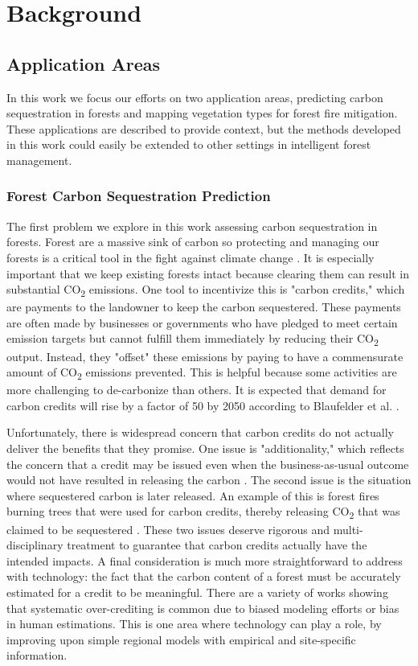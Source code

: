\chapter{Background} \label{chapBackground}
\section{Application Areas}
In this work we focus our efforts on two application areas, predicting carbon sequestration in forests and mapping vegetation types for forest fire mitigation. These applications are described to provide context, but the methods developed in this work could easily be extended to other settings in intelligent forest management.
\subsection{Forest Carbon Sequestration Prediction}
The first problem we explore in this work assessing carbon sequestration in forests. Forest are a massive sink of carbon so protecting and managing our forests is a critical tool in the fight against climate change \cite{Griscom2017NaturalSolutions}. 
It is especially important that we keep existing forests intact because clearing them can result in substantial CO\textsubscript{2} emissions. 
One tool to incentivize this is "carbon credits," which are payments to the landowner to keep the carbon sequestered. These payments are often made by businesses or governments who have pledged to meet certain emission targets but cannot fulfill them immediately by reducing their CO\textsubscript{2} output. Instead, they "offset" these emissions by paying to have a commensurate amount of CO\textsubscript{2} emissions prevented. This is helpful because some activities are more challenging to de-carbonize than others. 
It is expected that demand for carbon credits will rise by a factor of 50 by 2050 according to Blaufelder et al. \cite{Blaufelder2021AChallenge}. 

Unfortunately, there is widespread concern that carbon credits do not actually deliver the benefits that they promise. One issue is "additionality," which reflects the concern that a credit may be issued even when the business-as-usual outcome would not have resulted in releasing the carbon \cite{Gillenwater2011TheProgramme}.
The second issue is the situation where sequestered carbon is later released. An example of this is forest fires burning trees that were used for carbon credits, thereby releasing CO\textsubscript{2} that was claimed to be sequestered \cite{Kaplan2023AccountingMarkets}. These two issues deserve rigorous and multi-disciplinary treatment to guarantee that carbon credits actually have the intended impacts. A final consideration is much more straightforward to address with technology: the fact that the carbon content of a forest must be accurately estimated for a credit to be meaningful. There are a variety of works showing that systematic over-crediting is common \cite{Badgley2022SystematicProgram,West2020OverstatedAmazon} due to biased modeling efforts or bias in human estimations. This is one area where technology can play a role, by improving upon simple regional models with empirical and site-specific information. 

